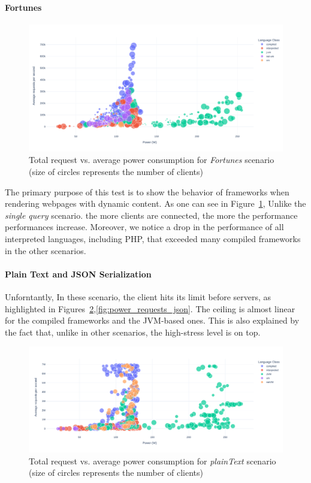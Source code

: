 \paragraph{Fortunes}
\begin{figure}[!h]
    \centering
    \includegraphics[width=\textwidth,height=\textheight,keepaspectratio]{imgs/power_requests_fortune}
    \caption{Total request vs. average power consumption for \emph{Fortunes}  scenario (size of circles represents the number of clients)}
    \label{fig:power_requests_fortunes}
\end{figure}
The primary purpose of this test is to show the behavior of frameworks when rendering webpages with dynamic content.
As one can see in Figure~\ref{fig:power_requests_fortunes}, Unlike the \emph{single query} scenario. the more clients are connected, the more the performance performances increase. Moreover, we notice a drop in the performance of all interpreted languages, including PHP, that exceeded many compiled frameworks in the other scenarios.

\paragraph{Plain Text and JSON Serialization}
Unforntantly, In these scenario, the client hits its limit before servers, as highlighted in Figures~\ref{fig:power_requests_plaintext},\ref{fig:power_requests_json}.
The ceiling is almost linear for the compiled frameworks and the JVM-based ones.
This is also explained by the fact that, unlike in other scenarios, the high-stress level is on top.
\begin{figure}[!h]
    \centering
    \includegraphics[width=\textwidth,height=\textheight,keepaspectratio]{imgs/power_requests_plaintext}
    \caption{Total request vs. average power consumption for \emph{plainText} scenario (size of circles represents the number of clients)}
    \label{fig:power_requests_plaintext}
\end{figure}


